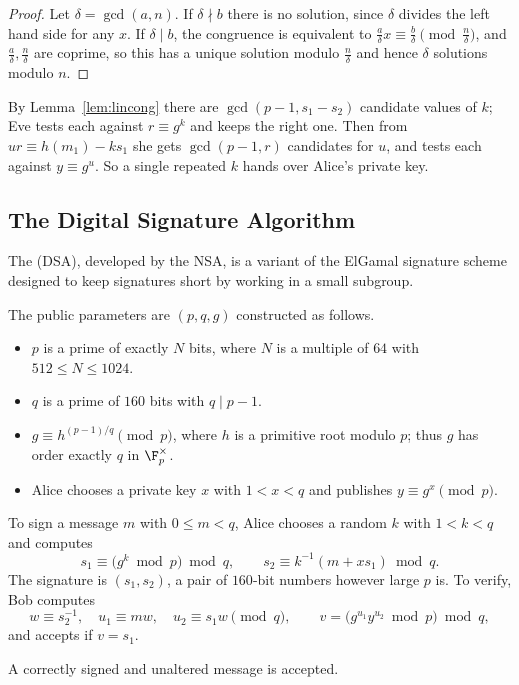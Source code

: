 \begin{proof}
	Let $\delta = \gcd(a,n)$. If $\delta\nmid b$ there is no solution, since $\delta$ divides the left hand side for any $x$. If $\delta\mid b$, the congruence is equivalent to $\frac a\delta x\equiv\frac b\delta \pmod{\frac n\delta}$, and $\frac a\delta, \frac n\delta$ are coprime, so this has a unique solution modulo $\frac n\delta$ and hence $\delta$ solutions modulo $n$.
\end{proof}

By Lemma~\ref{lem:lincong} there are $\gcd(p-1,s_1-s_2)$ candidate values of $k$; Eve tests each against $r\equiv g^k$ and keeps the right one. Then from $ur\equiv h(m_1)-ks_1$ she gets $\gcd(p-1,r)$ candidates for $u$, and tests each against $y \equiv g^u$. So a single repeated $k$ hands over Alice's private key.

\subsection{The Digital Signature Algorithm}

The  (DSA), developed by the NSA, is a variant of the ElGamal signature scheme designed to keep signatures short by working in a small subgroup.

The public parameters are $(p,q,g)$ constructed as follows.
\begin{itemize}
	\item $p$ is a prime of exactly $N$ bits, where $N$ is a multiple of $64$ with $512\le N\le1024$.
	\item $q$ is a prime of $160$ bits with $q \mid p-1$.
	\item $g \equiv h^{(p-1)/q}\pmod p$, where $h$ is a primitive root modulo $p$; thus $g$ has order exactly $q$ in $\F_p^\times$.
	\item Alice chooses a private key $x$ with $1<x<q$ and publishes $y \equiv g^x \pmod p$.
\end{itemize}

To sign a message $m$ with $0 \le m<q$, Alice chooses a random $k$ with $1<k<q$ and computes
$$s_1 \equiv \bigl(g^k \bmod p\bigr)\bmod q, \qquad s_2 \equiv k^{-1}(m+xs_1)\bmod q.$$
The signature is $(s_1,s_2)$, a pair of $160$-bit numbers however large $p$ is. To verify, Bob computes
$$w \equiv s_2^{-1}, \quad u_1 \equiv mw, \quad u_2\equiv s_1w \pmod q, \qquad v = \bigl(g^{u_1}y^{u_2}\bmod p\bigr)\bmod q,$$
and accepts if $v = s_1$.

\begin{proposition}
	A correctly signed and unaltered message is accepted.
\end{proposition}

